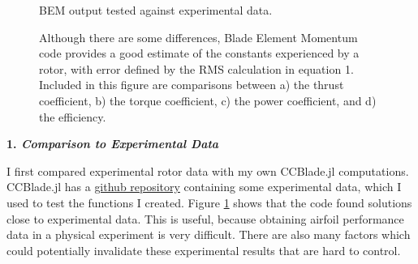 \documentclass{article}
\begin{document}
\begin{figure}
  \centering

  \hspace{1em}
  \caption{BEM output tested against experimental data.}
  \captionsetup{aboveskip=0pt,font=it}
  \caption*{Although there are some differences, Blade Element Momentum code provides a good estimate of the constants experienced by a rotor, with error defined by the RMS calculation in equation 1. Included in this figure are comparisons between a) the thrust coefficient, b) the torque coefficient, c) the power coefficient, and d) the efficiency.}
  \label{fig:2}
\end{figure}

\textbf{1. \emph{Comparison to Experimental Data}} \newline

I first compared experimental rotor data with my own CCBlade.jl computations. CCBlade.jl has a \href{https://github.com/byuflowlab/CCBlade.jl}{github repository} containing some experimental data, which I used to test the functions I created. Figure \ref{fig:2} shows that the code found solutions close to experimental data. This is useful, because obtaining airfoil performance data in a physical experiment is very difficult. There are also many factors which could potentially invalidate these experimental results that are hard to control. \newline
\end{document}

